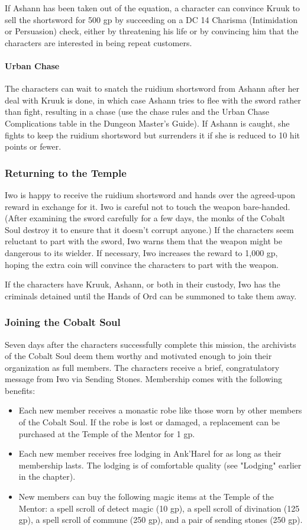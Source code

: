 \documentclass[10pt,a4paper,twoside,bg=print,twocolumn,openany,nodeprecatedcode]{dndbook}
\begin{document}
If Ashann has been taken out of the equation, a character can convince Kruuk to sell the shortsword for 500 gp by succeeding on a DC 14 Charisma (Intimidation or Persuasion) check, either by threatening his life or by convincing him that the characters are interested in being repeat customers.

\paragraph{Urban Chase}
The characters can wait to snatch the ruidium shortsword from Ashann after her deal with Kruuk is done, in which case Ashann tries to flee with the sword rather than fight, resulting in a chase (use the chase rules and the Urban Chase Complications table in the Dungeon Master's Guide). If Ashann is caught, she fights to keep the ruidium shortsword but surrenders it if she is reduced to 10 hit points or fewer.

\subsubsection{Returning to the Temple}
Iwo is happy to receive the ruidium shortsword and hands over the agreed-upon reward in exchange for it. Iwo is careful not to touch the weapon bare-handed. (After examining the sword carefully for a few days, the monks of the Cobalt Soul destroy it to ensure that it doesn't corrupt anyone.) If the characters seem reluctant to part with the sword, Iwo warns them that the weapon might be dangerous to its wielder. If necessary, Iwo increases the reward to 1,000 gp, hoping the extra coin will convince the characters to part with the weapon.

If the characters have Kruuk, Ashann, or both in their custody, Iwo has the criminals detained until the Hands of Ord can be summoned to take them away.

\subsubsection{Joining the Cobalt Soul}
Seven days after the characters successfully complete this mission, the archivists of the Cobalt Soul deem them worthy and motivated enough to join their organization as full members. The characters receive a brief, congratulatory message from Iwo via Sending Stones. Membership comes with the following benefits:


\begin{itemize}
\item Each new member receives a monastic robe like those worn by other members of the Cobalt Soul. If the robe is lost or damaged, a replacement can be purchased at the Temple of the Mentor for 1 gp.
\item Each new member receives free lodging in Ank'Harel for as long as their membership lasts. The lodging is of comfortable quality (see "Lodging" earlier in the chapter).
\item New members can buy the following magic items at the Temple of the Mentor: a spell scroll of detect magic (10 gp), a spell scroll of divination (125 gp), a spell scroll of commune (250 gp), and a pair of sending stones (250 gp).
\end{itemize}
\end{document}
